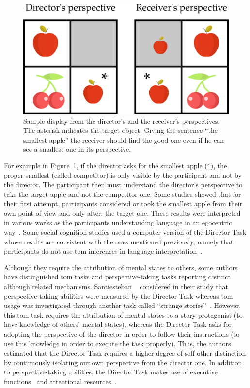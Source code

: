 \documentclass[a4paper,11pt,twoside]{StyleThese}
\begin{document}
\begin{figure}[ht!]
	\centering
	\includegraphics[scale=0.25]{figures/chapter4/dt_apple.png}
	\caption{\label{chap9:fig:dt_apple} Sample display from the director's and the receiver's perspectives. The asterisk indicates the target object. Giving the sentence ``the smallest apple'' the receiver should find the good one even if he can see a smallest one in its perspective. }
\end{figure}

For example in Figure~\ref{chap9:fig:dt_apple}, if the director asks for the smallest apple (*), the proper smallest (called competitor) is only visible by the participant and not by the director. The participant then must understand the director's perspective to take the target apple and not the competitor one. Some studies showed that for their first attempt, participants considered or took the smallest apple from their own point of view and only after, the target one. These results were interpreted in various works as the participants understanding language in an egocentric way~\cite{keysar_1994_illusory, keysar_1998_egocentric, keysar_2002_self, keysar_2003_limits}. 
Some social cognition studies used a computer-version of the Director Task whose results are consistent with the ones mentioned previously, namely that participants do not use \acrshort{tom} inferences in language interpretation~\cite{dumontheil_2010_online}.

Although they require the attribution of mental states to others, some authors have distinguished \acrshort{tom} tasks and perspective-taking tasks reporting distinct although related mechanisms. Santiesteban \etal{}~\cite{santiesteban_2012_training} considered in their study that perspective-taking abilities were measured by the Director Task whereas \acrshort{tom} usage was investigated through another task called ``strange stories''~\cite{happe_1994_advanced}. However, this \acrshort{tom} task requires the attribution of mental states to a story protagonist (to have knowledge of others' mental states), whereas the Director Task asks for adopting the perspective of the director in order to follow their instructions (to use this knowledge in order to execute the task properly). Thus, the authors estimated that the Director Task requires a higher degree of self-other distinction by continuously isolating our own perspective from the director one. In addition to perspective-taking abilities, the Director Task makes use of executive functions~\cite{rubio_2017_director} and attentional resources~\cite{lin_2010_reflexively}.
\end{document}
